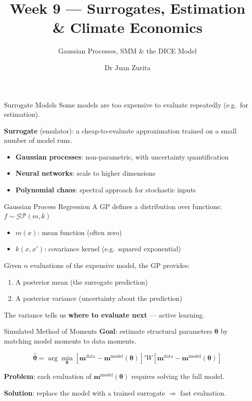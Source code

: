 \documentclass[aspectratio=169, 10pt]{beamer}
\title{Week 9 --- Surrogates, Estimation \& Climate Economics}
\subtitle{Gaussian Processes, SMM \& the DICE Model}
\author{Dr Juan Zurita}
\institute{Deep Learning for Macroeconomics\\
The University of Edinburgh~$\cdot$~School of Economics}
\date{}
\begin{document}
\maketitle

\begin{frame}{Surrogate Models}
Some models are too expensive to evaluate repeatedly (e.g.\ for estimation).

\bigskip
\textbf{Surrogate} (emulator): a cheap-to-evaluate approximation trained on a small number of model runs.

\bigskip
\begin{itemize}
\item \textbf{Gaussian processes}: non-parametric, with uncertainty quantification
\item \textbf{Neural networks}: scale to higher dimensions
\item \textbf{Polynomial chaos}: spectral approach for stochastic inputs
\end{itemize}
\end{frame}

\begin{frame}{Gaussian Process Regression}
A GP defines a distribution over functions: $f \sim \mathcal{GP}(m, k)$

\bigskip
\begin{itemize}
\item $m(x)$: mean function (often zero)
\item $k(x, x')$: covariance kernel (e.g.\ squared exponential)
\end{itemize}

\bigskip
Given $n$ evaluations of the expensive model, the GP provides:
\begin{enumerate}
\item A posterior mean (the surrogate prediction)
\item A posterior variance (uncertainty about the prediction)
\end{enumerate}

\bigskip
The variance tells us \textbf{where to evaluate next} --- active learning.
\end{frame}

\begin{frame}{Simulated Method of Moments}
\textbf{Goal}: estimate structural parameters $\boldsymbol{\theta}$ by matching model moments to data moments.

\bigskip
$$\hat{\boldsymbol{\theta}} = \arg\min_{\boldsymbol{\theta}} \left[\mathbf{m}^{\text{data}} - \mathbf{m}^{\text{model}}(\boldsymbol{\theta})\right]' W \left[\mathbf{m}^{\text{data}} - \mathbf{m}^{\text{model}}(\boldsymbol{\theta})\right]$$

\bigskip
\textbf{Problem}: each evaluation of $\mathbf{m}^{\text{model}}(\boldsymbol{\theta})$ requires solving the full model.

\textbf{Solution}: replace the model with a trained surrogate $\Rightarrow$ fast evaluation.
\end{frame}
\end{document}
